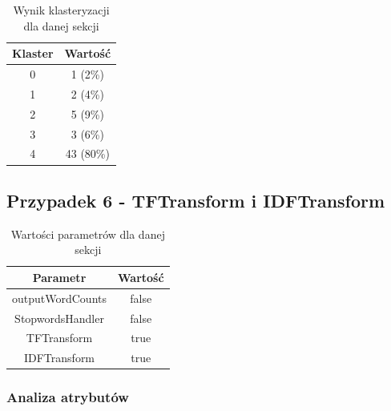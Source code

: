 \documentclass[../EDI_Task2_Karwowski_Kowalewski.tex]{subfiles}
\begin{document}
{{{            \begin{table}[!htbp]
                \small
                \centering
                \begin{tabular}{|c|c|}
                    \hline
                    Klaster & Wartość \\ \hline
                    0   &   1 (2\%) \\
                    1   &   2 (4\%) \\
                    2   &   5 (9\%) \\
                    3   &   3 (6\%) \\
                    4   &  43 (80\%) \\ \hline
                \end{tabular}
                \caption{Wynik klasteryzacji dla danej sekcji}
            \end{table}
            \FloatBarrier
        }
    }

    \subsection{Przypadek 6 - TFTransform i IDFTransform} {

        \begin{table}[!htbp]
            \small
            \centering
            \begin{tabular}{|c|c|}
                \hline
                Parametr & Wartość \\ \hline
                outputWordCounts & false \\ \hline
                StopwordsHandler & false \\ \hline
                TFTransform & true \\ \hline
                IDFTransform & true \\ \hline
            \end{tabular}
            \caption{Wartości parametrów dla danej sekcji}
        \end{table}
        \FloatBarrier

        \subsubsection{Analiza atrybutów} {

}}}
\end{document}
